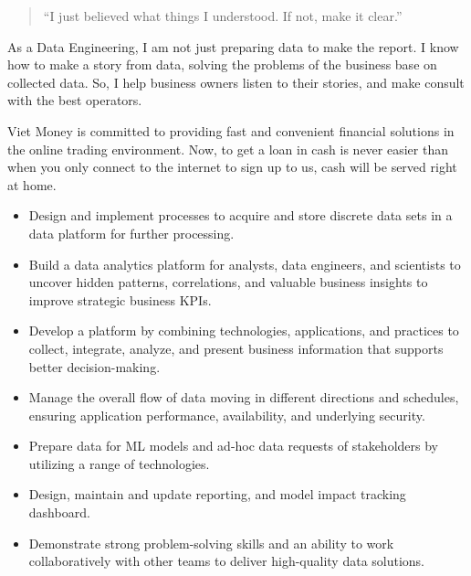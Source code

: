 \documentclass[10pt,a4paper,ragged2e,withhyper]{altacv}
\begin{document}
\begin{paracol}{2}
\bigskip

\begin{quote}
	``I just believed what things I understood. If not, make it clear.''
\end{quote}

\bigskip

\begin{minipage}{\linewidth}
\justifying
As a Data Engineering, I am not just preparing data to make the report. I know how to make a story from data, solving the problems of the business base on collected data. So, I help business owners listen to their stories, and make consult with the best operators. 
\end{minipage}

\smallskip



\begin{minipage}{\linewidth}
\justifying
Viet Money is committed to providing fast and convenient financial solutions in the online trading environment. Now, to get a loan in cash is never easier than when you only connect to the internet to sign up to us, cash will be served right at home.
\end{minipage}

\medskip

\begin{itemize}
    \item Design and implement processes to acquire and store discrete data sets in a data platform for further processing.
    \item  Build a data analytics platform for analysts, data engineers, and scientists to uncover hidden patterns, correlations, and valuable business insights to improve strategic business KPIs.
    \item  Develop a platform by combining technologies, applications, and practices to collect, integrate, analyze, and present business information that supports better decision-making.
    \item  Manage the overall flow of data moving in different directions and schedules, ensuring application performance, availability, and underlying security.
    \item  Prepare data for ML models and ad-hoc data requests of stakeholders by utilizing a range of technologies.
    \item  Design, maintain and update reporting, and model impact tracking dashboard.
    \item  Demonstrate strong problem-solving skills and an ability to work collaboratively with other teams to deliver high-quality data solutions.
\end{itemize}


\end{paracol}
\end{document}
